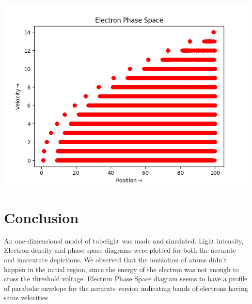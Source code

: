 \documentclass[12pt, a4paper]{report}
\begin{document}
\begin{center}
	\includegraphics[scale=0.80]{Figure_6} 
	\label{fig:rawdata}
\end{center}

\section*{Conclusion}
An one-dimensional model of tubelight was made and simulated. Light intensity, Electron density and phase space diagrams were plotted for both the accurate and inaccurate depictions. We observed that the ionization of atoms didn't happen in the initial region, since the energy of the electron was not enough to cross the threshold voltage. Electron Phase Space diagram seems to have a profile of parabolic envelope for the accurate version indicating bands of electrons having same velocities
\end{document}
